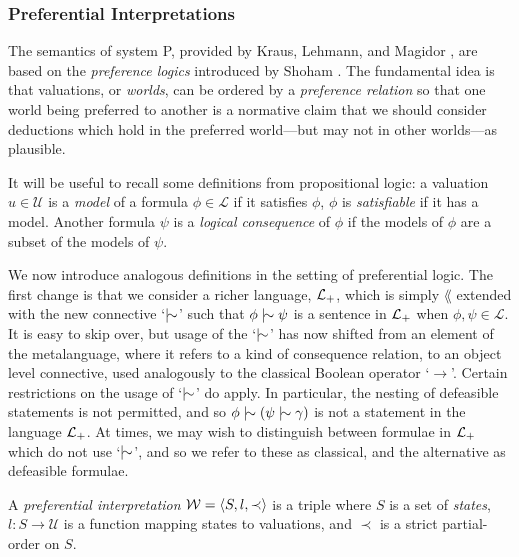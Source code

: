 \subsubsection{Preferential Interpretations}
\label{subsubsection:preferential-interpretations}

The semantics of system P, provided by Kraus, Lehmann, and Magidor \cite{kraus1990nonmonotonic}, are based on the \textit{preference
logics} introduced by Shoham \cite{shohamSemanticApproach}. The fundamental idea is that valuations, or \textit{worlds},
can be ordered by a \textit{preference relation} so that one world being preferred to another is a normative claim that we
should consider deductions which hold in the preferred world---but may not in other worlds---as plausible.

It will be useful to recall some definitions from propositional logic: a valuation $u \in \mathcal{U}$ is a \textit{model}
of a formula $\phi \in \mathcal{L}$ if it satisfies $\phi$, $\phi$ is \textit{satisfiable} if it has a model. Another
formula $\psi$ is a \textit{logical consequence} of $\phi$ if the models of $\phi$ are a subset of the models of $\psi$.

We now introduce analogous definitions in the setting of preferential logic. The first change is that we consider a
richer language, $\mathcal{L}_+$, which is simply $\lang$ extended with the new connective `$\twiddle$' such that
$\phi \twiddle \psi$ is a sentence in $\mathcal{L}_+$ when $\phi, \psi \in \mathcal{L}$. It is easy to skip over, but usage of
the `$\twiddle$' has now shifted from an element of the metalanguage, where it refers to a kind of consequence relation,
to an object level connective, used analogously to the classical Boolean operator `$\rightarrow$'. Certain restrictions
on the usage of `$\twiddle$' do apply. In particular, the nesting of defeasible statements is not permitted, and so $\phi
\twiddle (\psi \twiddle \gamma )$ is not a statement in the language $\mathcal{L}_+$. At times, we may wish to distinguish between
formulae in $\mathcal{L}_+$ which do not use `$\twiddle$', and so we refer to these as classical, and the alternative as defeasible
formulae.

\begin{definition}
	\label{definition:preferential-interpretation} 

	A \emph{preferential interpretation} $\mathcal{W} = \langle S,l,\prec \rangle$ is a triple where $S$ is a set of \emph{states}, $l: S \to \mathcal{U}$ is
	a function mapping states to valuations, and $\prec$ is a strict partial-order on $S$.
\end{definition}


